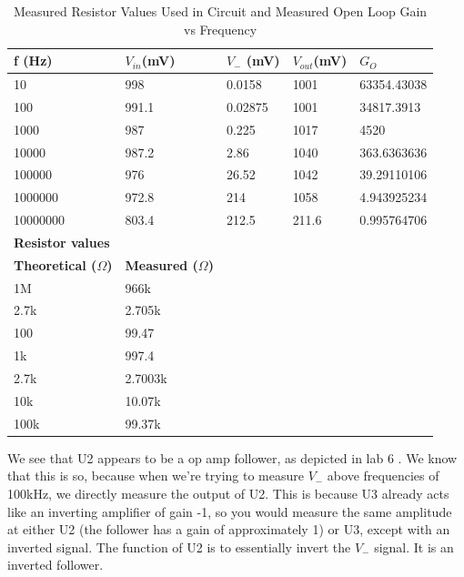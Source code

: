 \documentclass{article}
\begin{document}
    \begin{table}[H]
        \centering
        \caption{Measured Resistor Values Used in Circuit and Measured Open Loop Gain vs Frequency}
        \label{my-label}
        \begin{tabular}{lllll}
        \textbf{f (Hz)} & \textbf{$V_{in}$(mV)} & \textbf{$V_{-}$ (mV)} & \textbf{$V_{out}$(mV)} & \textbf{$G_O$} \\ \hline
        10 & 998 & 0.0158 & 1001 & 63354.43038 \\
        100 & 991.1 & 0.02875 & 1001 & 34817.3913 \\
        1000 & 987 & 0.225 & 1017 & 4520 \\
        10000 & 987.2 & 2.86 & 1040 & 363.6363636 \\
        100000 & 976 & 26.52 & 1042 & 39.29110106 \\
        1000000 & 972.8 & 214 & 1058 & 4.943925234 \\
        10000000 & 803.4 & 212.5 & 211.6 & 0.995764706 \\ \hline
        \textbf{Resistor values} & \textbf{} &  &  &  \\
        \textbf{Theoretical ($\Omega$)} & \textbf{Measured ($\Omega$)} &  &  &  \\ \cline{1-2}
        1M & 966k &  &  &  \\
        2.7k & 2.705k &  &  &  \\
        100 & 99.47 &  &  &  \\
        1k & 997.4 &  &  &  \\
        2.7k & 2.7003k &  &  &  \\
        10k & 10.07k &  &  &  \\
        100k & 99.37k &  &  & 
        \end{tabular}
        \end{table}
    We see that U2 appears to be a op amp follower, as depicted in lab 6 \cite{lab6}. We know that this is so, because when we're trying to measure $V_{-}$ above frequencies of 100kHz, we directly measure the output of U2. This is because U3 already acts like an inverting amplifier of gain -1, so you would measure the same amplitude at either U2 (the follower has a gain of approximately 1) or U3, except with an inverted signal. The function of U2 is to essentially invert the $V_-$ signal. It is an inverted follower.

\end{document}
